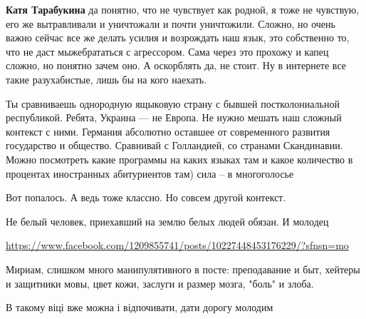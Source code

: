 \begin{itemize}
\begin{itemize}
\textbf{Катя Тарабукина} да понятно, что не чувствует как родной, я тоже не чувствую, его же вытравливали и уничтожали и почти уничтожили. Сложно, но очень важно сейчас все же делать усилия и возрождать наш язык, это собственно то, что не даст мыжебрататься с агрессором. Сама через это прохожу и капец сложно, но понятно зачем оно. А оскорблять да, не стоит. Ну в интернете все такие разухабистые, лишь бы на кого наехать.

 

Ты сравниваешь однородную ящыковую страну с бывшей постколониальной республикой. Ребята, Украина — не Европа. Не нужно мешать наш сложный контекст с ними. Германия абсолютно оставшее от современного развития государство и общество. Сравнивай с Голландией, со странами Скандинавии. Можно посмотреть какие программы на каких языках там и какое количество в процентах иностранных абитуриентов там) сила – в многоголосье

 

Вот попалось. А ведь тоже классно. Но совсем другой контекст. 

Не белый человек, приехавший на землю белых людей обязан. И молодец 

\url{https://www.facebook.com/1209855741/posts/10227448453176229/?sfnsn=mo}
\end{itemize}

 
Мириам, слишком много манипулятивного в посте: преподавание и быт, хейтеры и
защитники мовы, цвет кожи, заслуги и размер мозга, "боль" и злоба.

 
В такому віці вже можна і відпочивати, дати дорогу молодим


\end{itemize}
